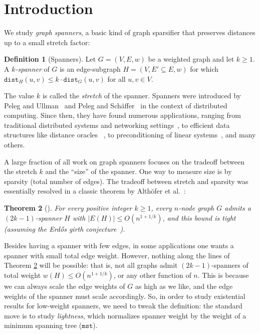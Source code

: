 \documentclass{article}
\newif\ifshort
\theoremstyle{plain}
\newtheorem{theorem}{Theorem}
\theoremstyle{definition}
\newtheorem{definition}[theorem]{Definition}
\newcommand{\dist}{\texttt{dist}}
\newcommand{\mst}{\texttt{mst}}
\begin{document}
\begin{titlepage}
\begin{abstract}
    Additional results include lower bounds on the $2f$-bicriteria lightness, improved $f$-dependence for $(2+\eta)f$-bicriteria lightness (for arbitrary constant $\eta > 0$), and a way to trade a slightly worse $f$-dependence for the ability to construct these spanners in polynomial time.
\end{abstract}
\ifshort \else
\thispagestyle{empty}
\end{titlepage}
\fi


\section{Introduction}


We study \emph{graph spanners}, a basic kind of graph sparsifier that preserves distances up to a small stretch factor:

\begin{definition} [Spanners]
Let $G = (V, E, w)$ be a weighted graph and let $k \ge 1$.
A \emph{$k$-spanner} of $G$ is an edge-subgraph $H = (V, E' \subseteq E, w)$ for which $\dist_H(u,v) \leq k \cdot \dist_G(u,v)$ for all $u,v \in V$.
\end{definition}

The value $k$ is called the \emph{stretch} of the spanner.  
Spanners were introduced by Peleg and Ullman~\cite{PU89sicomp} and Peleg and Sch\"{a}ffer~\cite{PS89} in the context of distributed computing.  Since then, they have found numerous applications, ranging from traditional distributed systems and networking settings~\cite{PU89jacm,awerbuch1990network,awerbuch1991cient,peleg2000distributed}, to efficient data structures like distance oracles~ \cite{TZ05}, to preconditioning of linear systems~\cite{elkin2008lower}, and many others.  

A  large fraction of all work on graph spanners focuses on the tradeoff between the stretch $k$ and the ``size'' of the spanner.
One way to measure size is by sparsity (total number of edges).  The tradeoff between stretch and sparsity was essentially resolved in a classic theorem by Alth\"ofer et al.~\cite{ADDJS93}:
\begin{theorem} [\cite{ADDJS93}] \label{thm:introsparsity}
For every positive integer $k \geq 1$, every $n$-node graph $G$ admits a $(2k-1)$-spanner $H$ with $|E(H)| \leq O(n^{1+1/k})$, and this bound is tight (assuming the Erd\H{o}s girth conjecture~\cite{girth}).
\end{theorem}

Besides having a spanner with few edges, in some applications one wants a spanner with small total edge weight.
However, nothing along the lines of Theorem \ref{thm:introsparsity} will be possible: that is, not all graphs admit $(2k-1)$-spanners of total weight $w(H) \le O(n^{1+1/k})$, or any other function of $n$.
This is because we can always scale the edge weights of $G$ as high as we like, and the edge weights of the spanner must scale accordingly.
So, in order to study existential results for low-weight spanners, we need to tweak the definition: the standard move is to study \emph{lightness}, which normalizes spanner weight by the weight of a minimum spanning tree ($\mst$).
\end{document}
